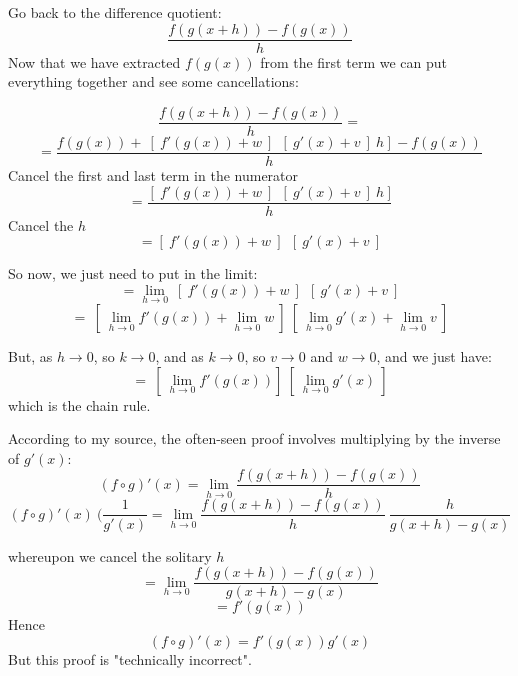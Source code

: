 \documentclass[11pt, oneside]{article}   	%
\begin{document}
Go back to the difference quotient:
\[ \frac{f(g(x+h)) - f(g(x))} { h }  \]
Now that we have extracted $f(g(x))$ from the first term we can put everything together and see some cancellations:

\[  \frac{f(g(x+h)) - f(g(x))} { h }  = \]
\[ = \frac{f(g(x)) + \ [ \ f'(g(x)) + w \ ] \ \ [ \ g'(x) + v \ ] \ h \ ] \ - f(g(x))}{h} \]
Cancel the first and last term in the numerator
\[ = \frac{[ \ f'(g(x)) + w \ ] \ \ [ \ g'(x) + v \ ] \ h \ ]}{h} \]
Cancel the $h$
\[ = [ \ f'(g(x)) + w \ ] \ \ [ \ g'(x) + v \ ] \]

So now, we just need to put in the limit:
\[ = \lim_{h \rightarrow 0} \ [ \ f'(g(x)) + w \ ] \ \ [ \ g'(x) + v \ ] \]
\[ = \ [  \ \lim_{h \rightarrow 0} f'(g(x)) +  \lim_{h \rightarrow 0} w \ ] \ [ \  \lim_{h \rightarrow 0} g'(x) +  \lim_{h \rightarrow 0} v \ ] \]

But, as $h \rightarrow 0$, so $k \rightarrow 0$, and as $k \rightarrow 0$, so $v \rightarrow 0$ and $w \rightarrow 0$, and we just have:
\[ = \ [  \ \lim_{h \rightarrow 0} f'(g(x))  ] \ [ \  \lim_{h \rightarrow 0} g'(x) \ ] \]
which is the chain rule.

According to my source, the often-seen proof involves multiplying by the inverse of $g'(x)$:
\[ (f \circ g)'(x) = \lim_{h \rightarrow 0} \frac{f(g(x+h)) - f(g(x))}{h} \]
\[ (f \circ g)'(x) \ (\frac{1}{g'(x)} = \lim_{h \rightarrow 0} \frac{f(g(x+h)) - f(g(x))}{h} \ \frac{h}{g(x+h)-g(x)} \]

whereupon we cancel the solitary $h$
\[ = \lim_{h \rightarrow 0} \frac{f(g(x+h)) - f(g(x))}{g(x+h)-g(x)} \]
\[ = f'(g(x)) \]
Hence
\[ (f \circ g)'(x) =  f'(g(x)) g'(x) \]
But this proof is "technically incorrect".
\end{document}
